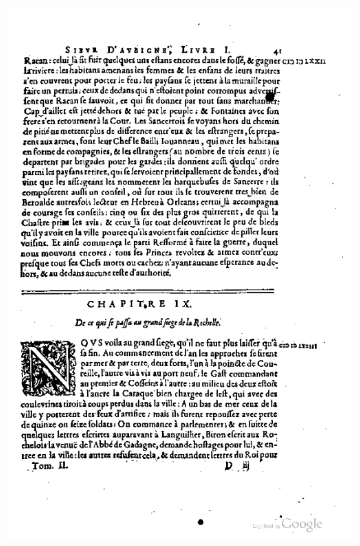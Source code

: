 \begin{figure}
\centering \begin{subfigure}[b]{0.4\textwidth}
    \includegraphics[width=\textwidth]{resources/500_0043}
    \end{subfigure}
    \begin{subfigure}[b]{0.4\textwidth}

\end{subfigure}
\end{figure}
